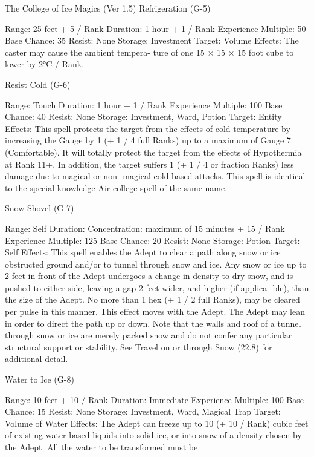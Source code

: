 \begin{Chapter}{The College of Ice Magics (Ver 1.5)}
Refrigeration (G-5) 

Range: 25 feet + 5 / Rank 
Duration: 1 hour + 1 / Rank 
Experience Multiple: 50 
Base Chance: 35%
Resist: None 
Storage: Investment 
Target: Volume 
Effects: The caster may cause the ambient tempera-
ture of one 15 × 15 × 15 foot cube to lower by 2°C 
/ Rank.  

Resist Cold (G-6) 

Range: Touch 
Duration: 1 hour + 1 / Rank 
Experience Multiple: 100 
Base Chance: 40%
Resist: None 
Storage: Investment, Ward, Potion 
Target: Entity 
Effects:  This  spell  protects  the  target  from  the 
effects  of  cold  temperature  by  increasing  the 
Gauge by 1 (+ 1 / 4 full Ranks) up to a maximum 
of Gauge 7 (Comfortable). It will totally protect the 
target  from  the  effects  of  Hypothermia  at  Rank 
11+.  In  addition,  the  target  suffers  1  (+  1  /  4  or 
fraction Ranks) less damage due to magical or non-
magical  cold  based  attacks.  This  spell  is  identical 
to  the  special  knowledge  Air  college  spell  of  the 
same name. 

Snow Shovel (G-7) 

Range: Self 
Duration: Concentration: maximum of 15 minutes 
+ 15 / Rank 
Experience Multiple: 125 
Base Chance: 20%
Resist: None 
Storage: Potion 
Target: Self 
Effects: This spell enables the Adept to clear a path 
along  snow  or  ice  obstructed  ground  and/or  to 
tunnel  through  snow  and  ice.  Any  snow  or  ice  up 
to 2 feet in front of the Adept undergoes a change 
in density to dry snow, and is pushed to either side, 
leaving  a  gap  2  feet  wider,  and  higher  (if  applica-
ble),  than  the  size  of  the  Adept.  No  more  than  1 
hex (+ 1 / 2 full Ranks),  may be cleared per pulse 
in  this  manner.  This  effect  moves  with  the  Adept. 
The  Adept  may  lean  in  order  to  direct the path  up 
or  down.  Note  that  the  walls  and  roof  of  a  tunnel 
through  snow  or  ice  are  merely  packed  snow  and 
do  not  confer  any  particular  structural  support  or 
stability. See Travel on or through Snow (22.8) for 
additional detail. 

Water to Ice (G-8) 

Range: 10 feet + 10 / Rank 
Duration: Immediate 
Experience Multiple: 100 
Base Chance: 15%
Resist: None 
Storage: Investment, Ward, Magical Trap 
Target: Volume of Water 
Effects:  The  Adept  can  freeze  up  to  10  (+  10  / 
Rank)  cubic  feet  of  existing  water  based  liquids 
into solid ice, or into snow of a density chosen by 
the Adept. All the water to be transformed must be 


\end{Chapter}
